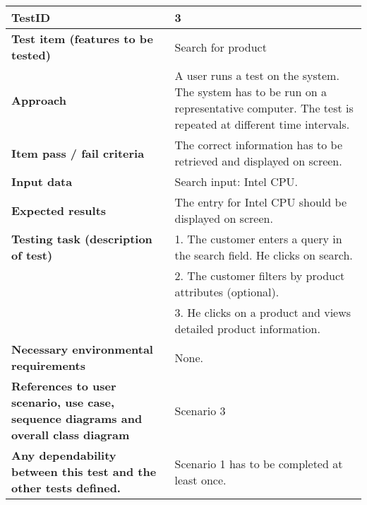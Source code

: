 \begin{table}
    \centering
	\begin{tabularx}{1.2\textwidth}{| p{5cm} | X |}
	\hline
	\textbf{TestID} 																&3 \\ \hline
	\textbf{Test item (features to be tested)} 											& Search for product\\ \hline
	\textbf{Approach} 															&  A user runs a test on the system. The system has to be run on a representative computer. 
																			The test is repeated at different time intervals. \\ \hline
	\textbf{Item pass / fail criteria} 													& The correct information has to be retrieved and displayed on screen.\\ \hline
	\textbf{Input data} 															& Search input: Intel CPU.\\ \hline
	\textbf{Expected results}									 					& The entry for Intel CPU should be displayed on screen.\\ \hline
	\textbf{Testing task (description of test)} 											& 1. The customer enters a query in the search field. He clicks on search.\\
																			& 2. The customer filters by product attributes (optional).\\
																			& 3. He clicks on a product and views detailed product information.          \\ \hline
	\textbf{Necessary environmental requirements} 										& None.\\ \hline
	\textbf{References to user scenario, use case, sequence diagrams and overall class diagram} 		& Scenario 3\\ \hline
	\textbf{Any dependability between this test and the other tests defined.}		 				& Scenario 1 has to be completed at least  once.\\ \hline
	\end{tabularx}
\end{table}


